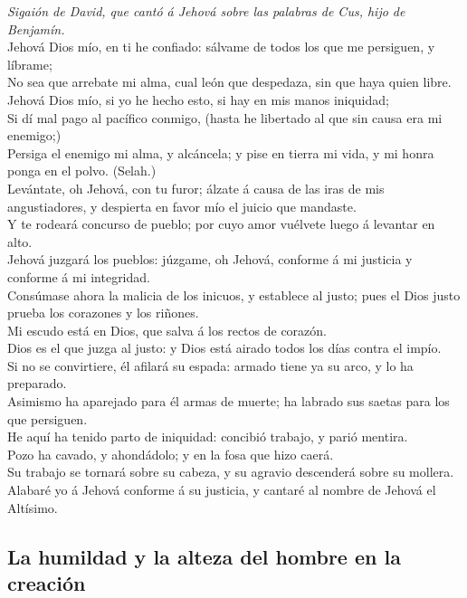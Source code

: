  \emph{Sigaión de David, que cantó á Jehová sobre las
palabras de Cus, hijo de Benjamín.}\\
Jehová Dios mío, en ti he confiado: sálvame de todos los que me
persiguen, y líbrame;\\
 No sea que arrebate mi alma, cual león que despedaza, sin
que haya quien libre.\\
 Jehová Dios mío, si yo he hecho esto, si hay en mis manos
iniquidad;\\
 Si dí mal pago al pacífico conmigo, (hasta he libertado al
que sin causa era mi enemigo;)\\
 Persiga el enemigo mi alma, y alcáncela; y pise en tierra
mi vida, y mi honra ponga en el polvo. (Selah.)\\
 Levántate, oh Jehová, con tu furor; álzate á causa de las
iras de mis angustiadores, y despierta en favor mío el juicio que
mandaste.\\
 Y te rodeará concurso de pueblo; por cuyo amor vuélvete
luego á levantar en alto.\\
 Jehová juzgará los pueblos: júzgame, oh Jehová, conforme á
mi justicia y conforme á mi integridad.\\
 Consúmase ahora la malicia de los inicuos, y establece al
justo; pues el Dios justo prueba los corazones y los riñones.\\
 Mi escudo está en Dios, que salva á los rectos de
corazón.\\
 Dios es el que juzga al justo: y Dios está airado todos
los días contra el impío.\\
 Si no se convirtiere, él afilará su espada: armado tiene
ya su arco, y lo ha preparado.\\
 Asimismo ha aparejado para él armas de muerte; ha labrado
sus saetas para los que persiguen.\\
 He aquí ha tenido parto de iniquidad: concibió trabajo, y
parió mentira.\\
 Pozo ha cavado, y ahondádolo; y en la fosa que hizo
caerá.\\
 Su trabajo se tornará sobre su cabeza, y su agravio
descenderá sobre su mollera.\\
 Alabaré yo á Jehová conforme á su justicia, y cantaré al
nombre de Jehová el Altísimo.

\hypertarget{la-humildad-y-la-alteza-del-hombre-en-la-creaciuxf3n}{%
\subsection{La humildad y la alteza del hombre en la
creación}\label{la-humildad-y-la-alteza-del-hombre-en-la-creaciuxf3n}}

